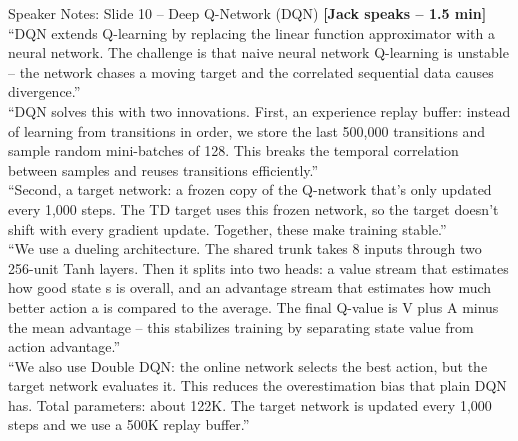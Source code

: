 \documentclass[aspectratio=169, 11pt]{beamer}
\begin{document}
\begin{frame}[allowframebreaks]{Speaker Notes: Slide 10 -- Deep Q-Network (DQN)}
\textbf{[Jack speaks -- 1.5 min]}\\
``DQN extends Q-learning by replacing the linear function approximator with a neural network. The challenge is that naive neural network Q-learning is unstable -- the network chases a moving target and the correlated sequential data causes divergence.''\\[0.5em]
``DQN solves this with two innovations. First, an experience replay buffer: instead of learning from transitions in order, we store the last 500,000 transitions and sample random mini-batches of 128. This breaks the temporal correlation between samples and reuses transitions efficiently.''\\[0.5em]
``Second, a target network: a frozen copy of the Q-network that's only updated every 1,000 steps. The TD target uses this frozen network, so the target doesn't shift with every gradient update. Together, these make training stable.''\\[0.5em]
``We use a dueling architecture. The shared trunk takes 8 inputs through two 256-unit Tanh layers. Then it splits into two heads: a value stream that estimates how good state s is overall, and an advantage stream that estimates how much better action a is compared to the average. The final Q-value is V plus A minus the mean advantage -- this stabilizes training by separating state value from action advantage.''\\[0.5em]
``We also use Double DQN: the online network selects the best action, but the target network evaluates it. This reduces the overestimation bias that plain DQN has. Total parameters: about 122K. The target network is updated every 1,000 steps and we use a 500K replay buffer.''
\end{frame}
\end{document}
